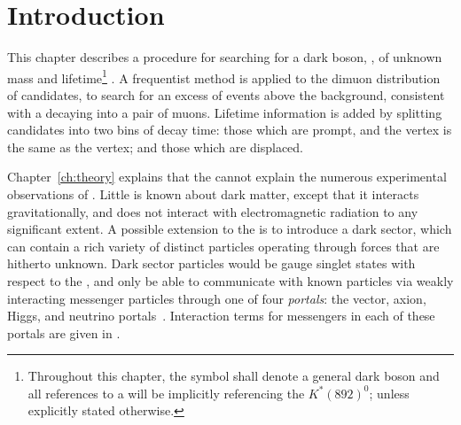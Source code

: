 \section{Introduction}
\label{sec:db:intro}


This chapter describes a procedure for searching for a dark boson, \db, of
unknown mass and lifetime\footnote{
  Throughout this chapter, the symbol \db shall denote a general dark boson and all references to
  a \Kstarz will be implicitly referencing the $K^*(892)^0$; unless explicitly stated otherwise.
} .
A frequentist method is applied to the dimuon distribution of \btokstrmumu candidates,
to search for an excess of events above the \sm background, consistent with a \db decaying into a
pair of muons.
Lifetime information is added by
splitting candidates into two bins of decay time: those which are prompt, and the \db vertex is the
same as the \Kstarz vertex; and
those which are displaced.

Chapter~\ref{ch:theory} explains that the \sm cannot explain
the numerous experimental observations of \dm.
Little is known about dark matter, except that it interacts gravitationally, and does not interact
with electromagnetic radiation to any significant extent.
A possible extension to the \sm is to introduce a dark sector, which can contain a rich variety of
distinct particles operating through forces that are hitherto unknown.
Dark sector particles would be gauge singlet states with respect to the \sm, and
only be able to communicate with known particles via weakly interacting messenger particles
through one of four \emph{portals}: the vector, axion, Higgs, and neutrino
portals~\cite{Essig:2013lka}.
Interaction terms for messengers in each of these portals are given in
.

